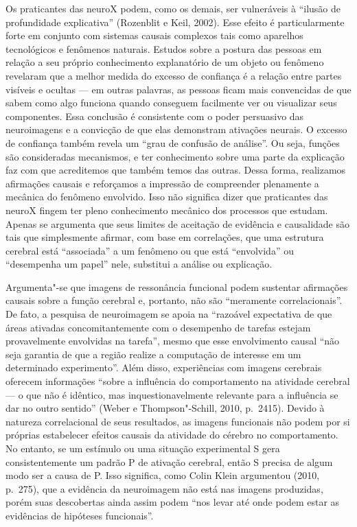 Os praticantes das neuroX podem, como os demais, ser vulneráveis à
``ilusão de profundidade explicativa'' (Rozenblit e Keil, 2002). Esse
efeito é particularmente forte em conjunto com sistemas causais
complexos tais como aparelhos tecnológicos e fenômenos naturais. Estudos
sobre a postura das pessoas em relação a seu próprio conhecimento
explanatório de um objeto ou fenômeno revelaram que a melhor medida do
excesso de confiança é a relação entre partes visíveis e ocultas --- em
outras palavras, as pessoas ficam mais convencidas de que sabem como
algo funciona quando conseguem facilmente ver ou visualizar seus
componentes. Essa conclusão é consistente com o poder persuasivo das
neuroimagens e a convicção de que elas demonstram ativações neurais. O
excesso de confiança também revela um ``grau de confusão de análise''.
Ou seja, funções são consideradas mecanismos, e ter conhecimento sobre
uma parte da explicação faz com que acreditemos que também temos das
outras. Dessa forma, realizamos afirmações causais e reforçamos a
impressão de compreender plenamente a mecânica do fenômeno envolvido.
Isso não significa dizer que praticantes das neuroX fingem ter pleno
conhecimento mecânico dos processos que estudam. Apenas se argumenta que
seus limites de aceitação de evidência e causalidade são tais que
simplesmente afirmar, com base em correlações, que uma estrutura
cerebral está ``associada'' a um fenômeno ou que está ``envolvida'' ou
``desempenha um papel'' nele, substitui a análise ou explicação.

Argumenta"-se que imagens de ressonância funcional podem
sustentar afirmações causais sobre a função cerebral e, portanto, não
são ``meramente correlacionais''. De fato, a pesquisa de neuroimagem se
apoia na ``razoável expectativa de que áreas ativadas concomitantemente
com o desempenho de tarefas estejam provavelmente envolvidas na
tarefa'', mesmo que esse envolvimento causal ``não seja garantia de que
a região realize a computação de interesse em um determinado
experimento''. Além disso, experiências com imagens cerebrais oferecem
informações ``sobre a influência do comportamento na atividade cerebral
--- o que não é idêntico, mas inquestionavelmente relevante para a
influência se dar no outro sentido'' (Weber e Thompson"-Schill, 2010,
p.~2415). Devido à natureza correlacional de seus resultados, as imagens
funcionais não podem por si próprias estabelecer efeitos causais da
atividade do cérebro no comportamento. No entanto, se um estímulo ou uma
situação experimental S gera consistentemente um padrão P de ativação
cerebral, então S precisa de algum modo ser a causa de P. Isso
significa, como Colin Klein argumentou (2010, p.~275), que a evidência da
neuroimagem não está nas imagens produzidas, porém suas descobertas
ainda assim podem ``nos levar até onde podem estar as evidências de
hipóteses funcionais''.

